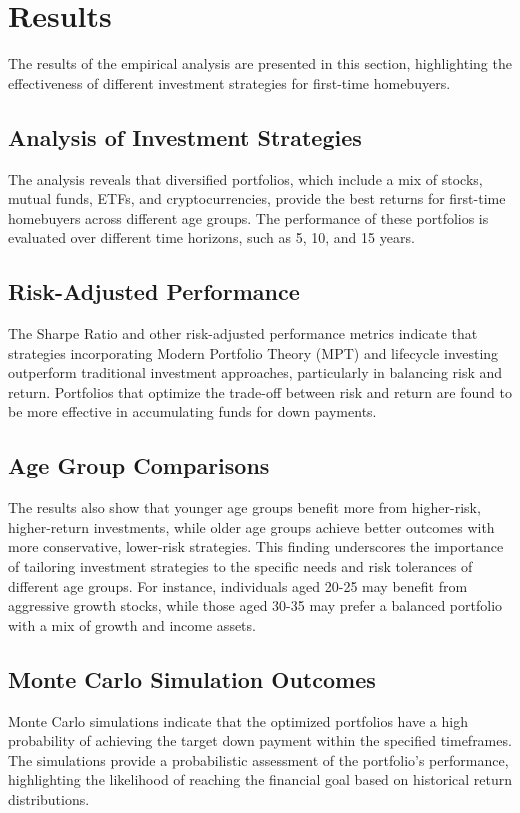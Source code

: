 \section{Results}

The results of the empirical analysis are presented in this section, highlighting the effectiveness of different investment strategies for first-time homebuyers.

\subsection{Analysis of Investment Strategies}
The analysis reveals that diversified portfolios, which include a mix of stocks, mutual funds, ETFs, and cryptocurrencies, provide the best returns for first-time homebuyers across different age groups. The performance of these portfolios is evaluated over different time horizons, such as 5, 10, and 15 years.

\subsection{Risk-Adjusted Performance}
The Sharpe Ratio and other risk-adjusted performance metrics indicate that strategies incorporating Modern Portfolio Theory (MPT) and lifecycle investing outperform traditional investment approaches, particularly in balancing risk and return. Portfolios that optimize the trade-off between risk and return are found to be more effective in accumulating funds for down payments.

\subsection{Age Group Comparisons}
The results also show that younger age groups benefit more from higher-risk, higher-return investments, while older age groups achieve better outcomes with more conservative, lower-risk strategies. This finding underscores the importance of tailoring investment strategies to the specific needs and risk tolerances of different age groups. For instance, individuals aged 20-25 may benefit from aggressive growth stocks, while those aged 30-35 may prefer a balanced portfolio with a mix of growth and income assets.

\subsection{Monte Carlo Simulation Outcomes}
Monte Carlo simulations indicate that the optimized portfolios have a high probability of achieving the target down payment within the specified timeframes. The simulations provide a probabilistic assessment of the portfolio's performance, highlighting the likelihood of reaching the financial goal based on historical return distributions.

